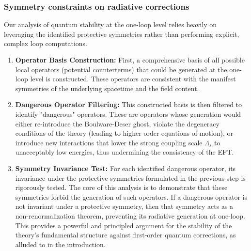 \documentclass[twocolumn]{aastex631}
\begin{document}
\subsubsection{Symmetry constraints on radiative corrections}
Our analysis of quantum stability at the one-loop level relies heavily on leveraging the identified protective symmetries rather than performing explicit, complex loop computations.
\begin{enumerate}
    \item \textbf{Operator Basis Construction:} First, a comprehensive basis of all possible local operators (potential counterterms) that could be generated at the one-loop level is constructed. These operators are consistent with the manifest symmetries of the underlying spacetime and the field content.
    \item \textbf{Dangerous Operator Filtering:} This constructed basis is then filtered to identify "dangerous" operators. These are operators whose generation would either re-introduce the Boulware-Deser ghost, violate the degeneracy conditions of the theory (leading to higher-order equations of motion), or introduce new interactions that lower the strong coupling scale $\Lambda_s$ to unacceptably low energies, thus undermining the consistency of the EFT.
    \item \textbf{Symmetry Invariance Test:} For each identified dangerous operator, its invariance under the protective symmetries formulated in the previous step is rigorously tested. The core of this analysis is to demonstrate that these symmetries forbid the generation of such operators. If a dangerous operator is not invariant under a protective symmetry, then that symmetry acts as a non-renormalization theorem, preventing its radiative generation at one-loop. This provides a powerful and principled argument for the stability of the theory's fundamental structure against first-order quantum corrections, as alluded to in the introduction.
\end{enumerate}
\end{document}
